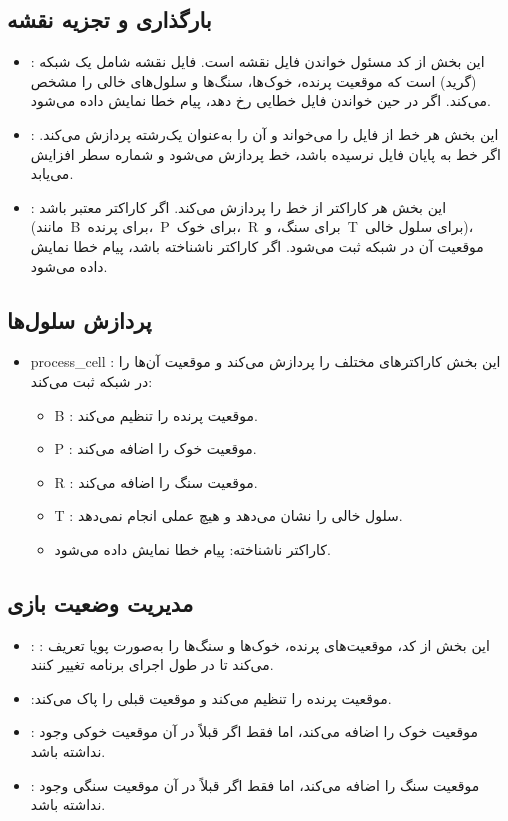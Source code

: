 \documentclass[11pt, a4paper, oneside]{article}
\begin{document}
		\subsection{
		بارگذاری و تجزیه نقشه 
		}
		\begin{itemize}
			\item  
			: این بخش از کد مسئول خواندن فایل نقشه است. فایل نقشه شامل یک شبکه (گرید) است که موقعیت پرنده، خوک‌ها، سنگ‌ها و سلول‌های خالی را مشخص می‌کند. اگر در حین خواندن فایل خطایی رخ دهد، پیام خطا نمایش داده می‌شود.
			\item  {}
			:  این بخش هر خط از فایل را می‌خواند و آن را به‌عنوان یک‌رشته پردازش می‌کند. اگر خط به پایان فایل نرسیده باشد، خط پردازش می‌شود و شماره سطر افزایش می‌یابد.
			\item  {}
			:  این بخش هر کاراکتر از خط را پردازش می‌کند. اگر کاراکتر معتبر باشد (مانند B برای پرنده، P برای خوک، R برای سنگ، و T برای سلول خالی)، موقعیت آن در شبکه ثبت می‌شود. اگر کاراکتر ناشناخته باشد، پیام خطا نمایش داده می‌شود.
		\end{itemize}
		\subsection{
پردازش سلول‌ها
}
\begin {itemize}
\item {process\_cell} : این بخش کاراکترهای مختلف را پردازش می‌کند و موقعیت آن‌ها را در شبکه ثبت می‌کند:
\begin{itemize}
	\item B : موقعیت پرنده را تنظیم می‌کند.
	\item P : موقعیت خوک را اضافه می‌کند.
	\item R :  موقعیت سنگ را اضافه می‌کند.
	\item T : سلول خالی را نشان می‌دهد و هیچ عملی انجام نمی‌دهد.
	\item کاراکتر ناشناخته: پیام خطا نمایش داده می‌شود.
\end{itemize}
\end{itemize}
		

		
	\subsection{مدیریت وضعیت بازی
		}
		\begin{itemize}
\item  : 
 :  این بخش از کد، موقعیت‌های پرنده، خوک‌ها و سنگ‌ها را به‌صورت پویا تعریف می‌کند تا در طول اجرای برنامه تغییر کنند.
\item {} :موقعیت پرنده را تنظیم می‌کند و موقعیت قبلی را پاک می‌کند.
\item {} :  موقعیت خوک را اضافه می‌کند، اما فقط اگر قبلاً در آن موقعیت خوکی وجود نداشته باشد.
\item {} : موقعیت سنگ را اضافه می‌کند، اما فقط اگر قبلاً در آن موقعیت سنگی وجود نداشته باشد.
		\end{itemize}
\end{document}
